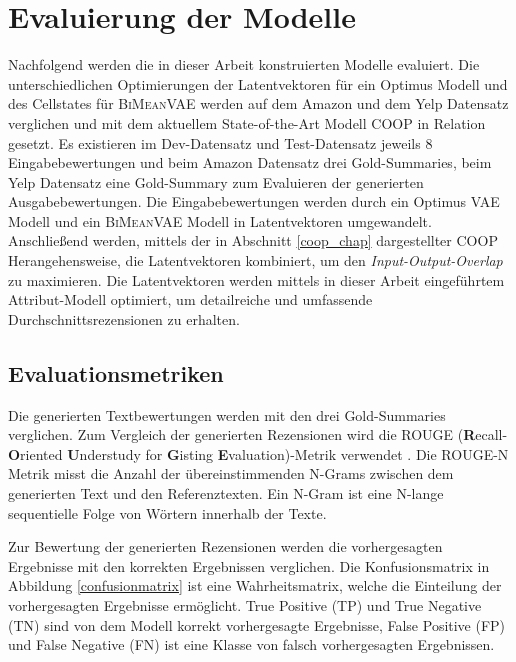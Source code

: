 \section{Evaluierung der Modelle}\raggedbottom
\label{evalmetric}
Nachfolgend werden die in dieser Arbeit konstruierten Modelle evaluiert.
Die unterschiedlichen Optimierungen der Latentvektoren für ein Optimus Modell und des Cellstates für \textsc{BiMeanVAE} werden auf dem Amazon und dem Yelp Datensatz verglichen und mit dem aktuellem State-of-the-Art Modell COOP in Relation gesetzt.
Es existieren im Dev-Datensatz und Test-Datensatz jeweils 8 Eingabebewertungen und beim Amazon Datensatz drei Gold-Summaries, beim Yelp Datensatz eine Gold-Summary zum Evaluieren der generierten Ausgabebewertungen.
Die Eingabebewertungen werden durch ein Optimus VAE Modell und ein \textsc{BiMeanVAE} Modell in Latentvektoren umgewandelt.
Anschließend werden, mittels der in Abschnitt \ref{coop_chap} dargestellter COOP Herangehensweise, die Latentvektoren kombiniert, um den \textit{Input-Output-Overlap} zu maximieren. 
Die Latentvektoren werden mittels in dieser Arbeit eingeführtem Attribut-Modell optimiert, um detailreiche und umfassende Durchschnittsrezensionen zu erhalten.

\subsection{Evaluationsmetriken}
\label{eval_metrics_chapter}
Die generierten Textbewertungen werden mit den drei Gold-Summaries verglichen.
Zum Vergleich der generierten Rezensionen wird die ROUGE (\textbf{R}ecall-\textbf{O}riented \textbf{U}nderstudy for \textbf{G}isting \textbf{E}valuation)-Metrik verwendet \citep{lin-2004-rouge}.
Die ROUGE-N Metrik misst die Anzahl der übereinstimmenden N-Grams zwischen dem generierten Text und den Referenztexten. 
Ein N-Gram ist eine N-lange sequentielle Folge von Wörtern innerhalb der Texte. 

Zur Bewertung der generierten Rezensionen werden die vorhergesagten Ergebnisse mit den korrekten Ergebnissen verglichen. 
Die Konfusionsmatrix in Abbildung \ref{confusionmatrix} ist eine Wahrheitsmatrix, welche die Einteilung der vorhergesagten Ergebnisse ermöglicht. 
True Positive (TP) und True Negative (TN) sind von dem Modell korrekt vorhergesagte Ergebnisse, False Positive (FP) und False Negative (FN) ist eine Klasse von falsch vorhergesagten Ergebnissen.



